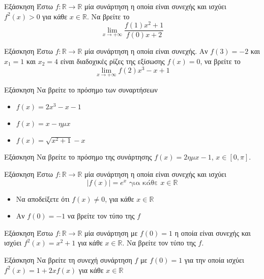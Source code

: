 \documentclass[greek]{beamer}
\begin{document}
\begin{frame}{Εξάσκηση}
  Έστω $f:\mathbb{R}\to\mathbb{R}$ μία συνάρτηση η οποία είναι συνεχής και ισχύει $f^2(x)>0$ για κάθε $x\in\mathbb{R}$. Να βρείτε το
  $$\lim\limits_{x \to +\infty}{ \frac{f(1)x^2+1}{f(0)x+2} }$$
\end{frame}

\begin{frame}{Εξάσκηση}
  Έστω $f:\mathbb{R}\to\mathbb{R}$ μία συνάρτηση η οποία είναι συνεχής. Αν $f(3)=-2$ και $x_1=1$ και $x_2=4$ είναι διαδοχικές ρίζες της εξίσωσης $f(x)=0$, να βρείτε το
  $$\lim\limits_{x \to +\infty}{ f(2)x^3-x+1 }$$
\end{frame}

\begin{frame}{Εξάσκηση}
  Να βρείτε το πρόσημο των συναρτήσεων
  \begin{itemize}
    \item $f(x)=2x^3-x-1$
    \item $f(x)=x-ημx$
    \item $f(x)=\sqrt{x^2+1}-x$
  \end{itemize}
\end{frame}

\begin{frame}{Εξάσκηση}
  Να βρείτε το πρόσημο της συνάρτησης $f(x)=2ημx-1$, $x\in [0,π]$.
\end{frame}

\begin{frame}{Εξάσκηση}
  Έστω $f:\mathbb{R}\to\mathbb{R}$ μία συνάρτηση η οποία είναι συνεχής και ισχύει
  $$|f(x)|=e^x \text{ για κάθε } x\in\mathbb{R}$$
  \begin{itemize}
    \item Να αποδείξετε ότι $f(x)\ne 0$, για κάθε $x\in\mathbb{R}$
    \item Αν $f(0)=-1$ να βρείτε τον τύπο της $f$
  \end{itemize}
\end{frame}

\begin{frame}{Εξάσκηση}
  Έστω $f:\mathbb{R}\to\mathbb{R}$ μία συνάρτηση με $f(0)=1$ η οποία είναι συνεχής και ισχύει $f^2(x)=x^2+1$ για κάθε $x\in\mathbb{R}$. Να βρείτε τον τύπο της $f$.
\end{frame}

\begin{frame}{Εξάσκηση}
  Να βρείτε τη συνεχή συνάρτηση $f$ με $f(0)=1$ για την οποία ισχύει $f^2(x)=1+2xf(x)$ για κάθε $x\in\mathbb{R}$
\end{frame}
\end{document}
